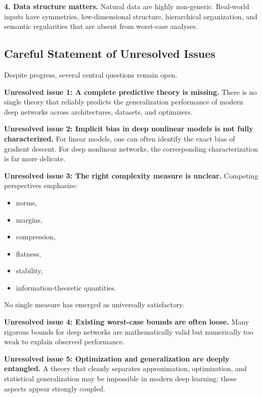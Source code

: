 \medskip

\noindent
\textbf{4. Data structure matters.}
Natural data are highly non-generic. Real-world inputs have symmetries, low-dimensional structure, hierarchical organization, and semantic regularities that are absent from worst-case analyses.

\subsection{Careful Statement of Unresolved Issues}

Despite progress, several central questions remain open.

\medskip

\noindent
\textbf{Unresolved issue 1: A complete predictive theory is missing.}
There is no single theory that reliably predicts the generalization performance of modern deep networks across architectures, datasets, and optimizers.

\medskip

\noindent
\textbf{Unresolved issue 2: Implicit bias in deep nonlinear models is not fully characterized.}
For linear models, one can often identify the exact bias of gradient descent. For deep nonlinear networks, the corresponding characterization is far more delicate.

\medskip

\noindent
\textbf{Unresolved issue 3: The right complexity measure is unclear.}
Competing perspectives emphasize:
\begin{itemize}
    \item norms,
    \item margins,
    \item compression,
    \item flatness,
    \item stability,
    \item information-theoretic quantities.
\end{itemize}
No single measure has emerged as universally satisfactory.

\medskip

\noindent
\textbf{Unresolved issue 4: Existing worst-case bounds are often loose.}
Many rigorous bounds for deep networks are mathematically valid but numerically too weak to explain observed performance.

\medskip

\noindent
\textbf{Unresolved issue 5: Optimization and generalization are deeply entangled.}
A theory that cleanly separates approximation, optimization, and statistical generalization may be impossible in modern deep learning; these aspects appear strongly coupled.

